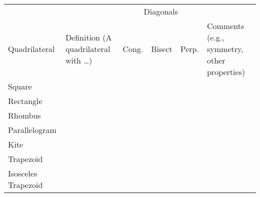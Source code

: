 {
\renewcommand\arraystretch{2.8}
\renewcommand\tabcolsep{12pt}
\begin{table}[h]
\begin{tabular}{|l|p{6cm}|c|c|c|p{8cm}|}
\hline 
 &   & \multicolumn{3}{c|}{Diagonals} &  \\  %
Quadrilateral & Definition (A quadrilateral with \dots) & \begin{sideways}Cong.\end{sideways} & 
\begin{sideways}Bisect\end{sideways} & \begin{sideways}Perp.\end{sideways} & Comments (e.g., symmetry, other properties) \\ \hline\hline
Square           &            &   &  &         &                  \\  \hline
Rectangle       &           &   &  &         &                  \\ \hline
Rhombus        &           &   &  &         &                  \\ \hline
Parallelogram &           &   &  &         &                  \\ \hline
Kite                &           &   &  &          &                  \\ \hline
Trapezoid       &           &   &  &         &                  \\ \hline
Isosceles Trapezoid       &           &   &  &         &                  \\ \hline
\end{tabular}
\end{table}
}




